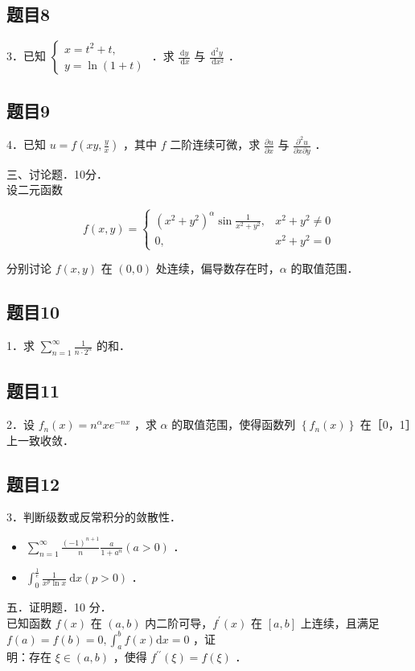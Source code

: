 \documentclass{article}
\begin{document}
\subsection{题目8}
3．已知 \(\left\{\begin{array}{l}x=t^{2}+t, \\ y=\ln (1+t)\end{array}\right.\) ．求 \(\frac{\mathrm{d} y}{\mathrm{~d} x}\) 与 \(\frac{\mathrm{d}^{2} y}{\mathrm{~d} x^{2}}\) ．

\subsection{题目9}
4．已知 \(u=f\left(x y, \frac{y}{x}\right)\) ，其中 \(f\) 二阶连续可微，求 \(\frac{\partial u}{\partial x}\) 与 \(\frac{\partial^{2} u}{\partial x \partial y}\) ．

三、讨论题．10分．\\
设二元函数

\[
f(x, y)= \begin{cases}\left(x^{2}+y^{2}\right)^{\alpha} \sin \frac{1}{x^{2}+y^{2}}, & x^{2}+y^{2} \neq 0 \\ 0, & x^{2}+y^{2}=0\end{cases}
\]

分别讨论 \(f(x, y)\) 在 \((0,0)\) 处连续，偏导数存在时，\(\alpha\) 的取值范围．

\subsection{题目10}
1．求 \(\sum_{n=1}^{\infty} \frac{1}{n \cdot 2^{n}}\) 的和．

\subsection{题目11}
2．设 \(f_{n}(x)=n^{\alpha} x e^{-n x}\) ，求 \(\alpha\) 的取值范围，使得函数列 \(\left\{f_{n}(x)\right\}\) 在［0，1］上一致收敛．

\subsection{题目12}
3．判断级数或反常积分的敛散性．

\begin{itemize}
  \item[（1）] \(\sum_{n=1}^{\infty} \frac{(-1)^{n+1}}{n} \frac{a}{1+a^{n}}(a>0)\) ．
  \item[（2）] \(\int_{0}^{\frac{1}{e}} \frac{1}{x^{p} \ln x} \mathrm{~d} x(p>0)\) ．
\end{itemize}

五．证明题．10 分．\\
已知函数 \(f(x)\) 在 \((a, b)\) 内二阶可导，\(f^{\prime}(x)\) 在 \([a, b]\) 上连续，且满足 \(f(a)=f(b)=0, \int_{a}^{b} f(x) \mathrm{d} x=0\) ，证\\
明：存在 \(\xi \in(a, b)\) ，使得 \(f^{\prime \prime}(\xi)=f(\xi)\) ．
\end{document}
